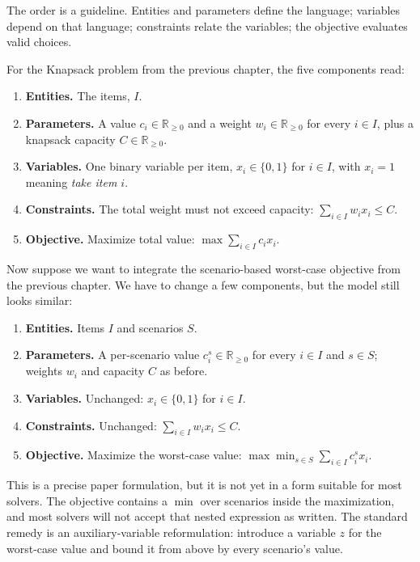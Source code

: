The order is a guideline. Entities and parameters define the language;
variables depend on that language; constraints relate the variables; the
objective evaluates valid choices.

For the Knapsack problem from the previous chapter, the five components
read:

\begin{enumerate}
\item
  \textbf{Entities.} The items, \(I\).
\item
  \textbf{Parameters.} A value \(c_i \in \mathbb{R}_{\ge 0}\) and a
  weight \(w_i \in \mathbb{R}_{\ge 0}\) for every \(i \in I\), plus a
  knapsack capacity \(C \in \mathbb{R}_{\ge 0}\).
\item
  \textbf{Variables.} One binary variable per item, \(x_i \in \{0, 1\}\)
  for \(i \in I\), with \(x_i = 1\) meaning \emph{take item \(i\)}.
\item
  \textbf{Constraints.} The total weight must not exceed capacity:
  \(\sum_{i \in I} w_i x_i \le C\).
\item
  \textbf{Objective.} Maximize total value:
  \(\max \sum_{i \in I} c_i x_i\).
\end{enumerate}

Now suppose we want to integrate the scenario-based worst-case objective
from the previous chapter. We have to change a few components, but the
model still looks similar:

\begin{enumerate}
\item
  \textbf{Entities.} Items \(I\) and scenarios \(S\).
\item
  \textbf{Parameters.} A per-scenario value
  \(c_i^s \in \mathbb{R}_{\ge 0}\) for every \(i \in I\) and
  \(s \in S\); weights \(w_i\) and capacity \(C\) as before.
\item
  \textbf{Variables.} Unchanged: \(x_i \in \{0, 1\}\) for \(i \in I\).
\item
  \textbf{Constraints.} Unchanged: \(\sum_{i \in I} w_i x_i \le C\).
\item
  \textbf{Objective.} Maximize the worst-case value:
  \(\max \min_{s \in S} \sum_{i \in I} c_i^s x_i\).
\end{enumerate}

This is a precise paper formulation, but it is not yet in a form
suitable for most solvers. The objective contains a \(\min\) over
scenarios inside the maximization, and most solvers will not accept that
nested expression as written. The standard remedy is an
auxiliary-variable reformulation: introduce a variable \(z\) for the
worst-case value and bound it from above by every scenario's value.

